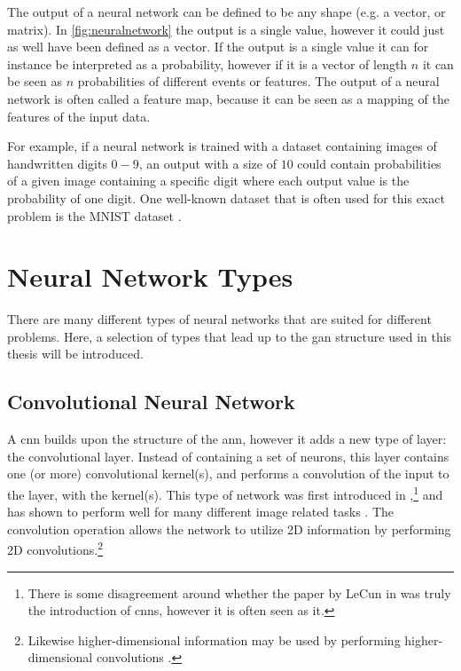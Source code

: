 The output of a neural network can be defined to be any shape (e.g. a vector, or matrix). In \cref{fig:neuralnetwork} the output is a single value, however it could just as well have been defined as a vector. If the output is a single value it can for instance be interpreted as a probability, however if it is a vector of length $n$ it can be seen as $n$ probabilities of different events or features. The output of a neural network is often called a feature map, because it can be seen as a mapping of the features of the input data. 

For example, if a neural network is trained with a dataset containing images of handwritten digits $0-9$, an output with a size of $10$ could contain probabilities of a given image containing a specific digit where each output value is the probability of one digit. One well-known dataset that is often used for this exact problem is the MNIST dataset \cite{mnist}.


\section{Neural Network Types}
There are many different types of neural networks that are suited for different problems. Here, a selection of types that lead up to the \gls{gan} structure used in this thesis will be introduced. 

\subsection{Convolutional Neural Network}
A \gls{cnn} builds upon the structure of the \gls{ann}, however it adds a new type of layer: the convolutional layer. Instead of containing a set of neurons, this layer contains one (or more) convolutional kernel(s), and performs a convolution of the input to the layer, with the kernel(s). This type of network was first introduced in \citeyear{lecun1999object},\footnote{There is some disagreement around whether the paper by LeCun in \citeyear{lecun1999object} \cite{lecun1999object} was truly the introduction of \gls{cnn}s, however it is often seen as it. } and has shown to perform well for many different image related tasks \cite{lecun1999object,alexnet}. The convolution operation allows the network to utilize 2D information by performing 2D convolutions.\footnote{Likewise higher-dimensional information may be used by performing higher-dimensional convolutions \cite{8353466}. }


